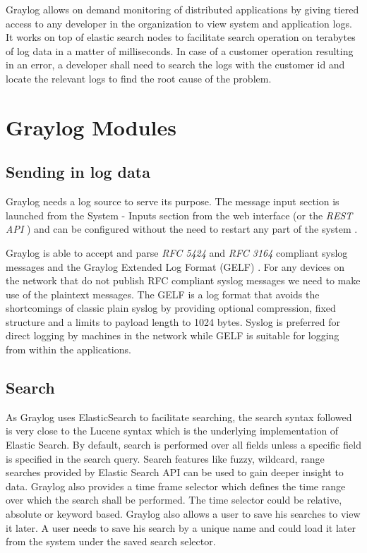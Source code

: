 \documentclass[9pt,twocolumn,twoside]{../../styles/osajnl}
\begin{document}
Graylog allows on demand monitoring of distributed applications by
giving tiered access to any developer in the organization to view
system and application logs. It works on top of elastic search nodes
to facilitate search operation on terabytes of log data in a matter
of milliseconds. In case of a customer operation resulting in an
error, a developer shall need to search the logs with the customer id
and locate the relevant logs to find the root cause of the problem.

\section{Graylog Modules}


\subsection{Sending in log data}

Graylog needs a log source to serve its purpose. The message input
section is launched from the System - Inputs section from the web
interface (or the \emph{REST API} \cite{www-rest-wiki}) and can be
configured without the need to restart any part of the system
\cite{www-graylog-sending_data}.

Graylog is able to accept and parse \emph{RFC 5424}
\cite{www-rfc5424-ietf} and \emph{RFC 3164} \cite{www-rfc3164-ietf}
compliant syslog messages and the Graylog Extended Log Format (GELF)
\cite{www-graylog-sending_data}. For any devices on the network that
do not publish RFC compliant syslog messages we need to make use of
the plaintext messages.  The GELF is a log format that avoids the
shortcomings of classic plain syslog by providing optional
compression, fixed structure and a limits to payload length to 1024
bytes. Syslog is preferred for direct logging by machines in the
network while GELF is suitable for logging from within the
applications.

\subsection{Search}

As Graylog uses ElasticSearch to facilitate searching, the search
syntax followed is very close to the Lucene syntax which is the
underlying implementation of Elastic Search. By default, search is
performed over all fields unless a specific field is specified in the
search query. Search features like fuzzy, wildcard, range searches
provided by Elastic Search API can be used to gain deeper insight to
data.  Graylog also provides a time frame selector which defines the
time range over which the search shall be performed. The time selector
could be relative, absolute or keyword based.
Graylog also allows a user to save his searches to view it later. A
user needs to save his search by a unique name and could load it later
from the system under the saved search selector.
 
\end{document}
